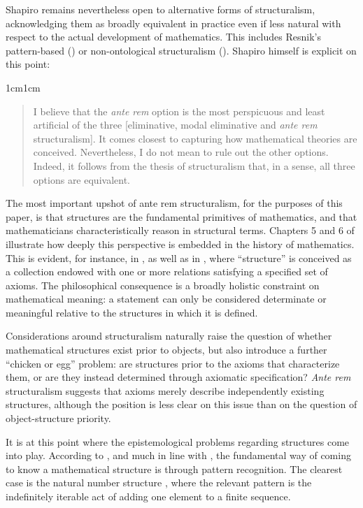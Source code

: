 \documentclass[11pt,a4paper]{book}
\theoremstyle{plain}
\begin{document}
Shapiro remains nevertheless open to alternative forms of structuralism, acknowledging them as broadly equivalent in practice even if less natural with respect to the actual development of mathematics. This includes Resnik's pattern-based (\citeyear{Resnik1981}) or non-ontological structuralism (\citeyear{Resnik2018NonOntological}). Shapiro himself is explicit on this point:

\begin{adjustwidth}{1cm}{1cm}
\small
\begin{quote}
I believe that the \textit{ante rem} option is the most perspicuous and least artificial of the three [eliminative, modal eliminative and \textit{ante rem} structuralism]. It comes closest to capturing how mathematical theories are conceived. Nevertheless, I do not mean to rule out the other options. Indeed, it follows from the thesis of structuralism that, in a sense, all three options are equivalent. \parencite[p. 90]{Shapiro1997}
\end{quote}
\end{adjustwidth}

The most important upshot of ante rem structuralism, for the purposes of this paper, is that structures are the fundamental primitives of mathematics, and that mathematicians characteristically reason in structural terms. Chapters 5 and 6 of \textcite{Shapiro1997} illustrate how deeply this perspective is embedded in the history of mathematics. This is evident, for instance, in \textcite{Dedekind1888}, as well as in \textcite{Bourbaki1950}, where “structure” is conceived as a collection endowed with one or more relations satisfying a specified set of axioms. The philosophical consequence is a broadly holistic constraint on mathematical meaning: a statement can only be considered determinate or meaningful relative to the structures in which it is defined.

Considerations around structuralism naturally raise the question of whether mathematical structures exist prior to objects, but also introduce a further “chicken or egg” problem: are structures prior to the axioms that characterize them, or are they instead determined through axiomatic specification? \textit{Ante rem} structuralism suggests that axioms merely describe independently existing structures, although the position is less clear on this issue than on the question of object-structure priority.

It is at this point where the epistemological problems regarding structures come into play. According to \textcite{Shapiro1997}, and much in line with \textcite{Resnik1981}, the fundamental way of coming to know a mathematical structure is through pattern recognition. The clearest case is the natural number structure \parencite[pp. 118-119]{Shapiro1997}, where the relevant pattern is the indefinitely iterable act of adding one element to a finite sequence.
\end{document}
